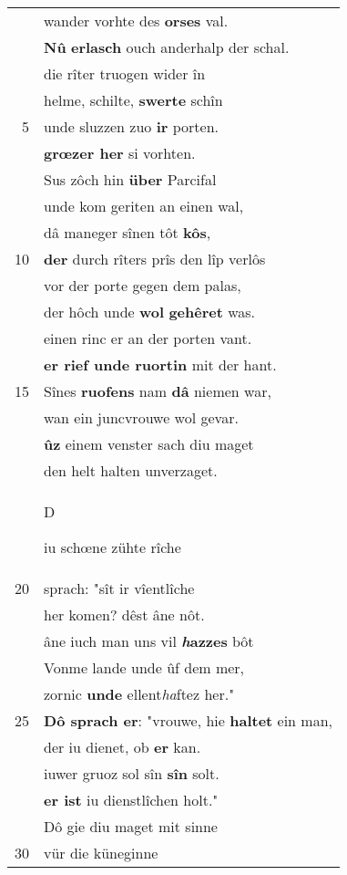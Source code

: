 \documentclass[8pt,a4paper,notitlepage]{article}
\begin{document}
\begin{table}[ht]
\begin{minipage}[t]{0.5\linewidth}
\begin{tabular}{rl}
 & wander vorhte des \textbf{orses} val.\\ 
 & \textbf{Nû} \textbf{erlasch} ouch anderhalp der schal.\\ 
 & die rîter truogen wider în\\ 
 & helme, schilte, \textbf{swerte} schîn\\ 
5 & unde sluzzen zuo \textbf{ir} porten.\\ 
 & \textbf{grœzer her} si vorhten.\\ 
 & Sus zôch hin \textbf{über} Parcifal\\ 
 & unde kom geriten an einen wal,\\ 
 & dâ maneger sînen tôt \textbf{kôs},\\ 
10 & \textbf{der} durch rîters prîs den lîp verlôs\\ 
 & vor der porte gegen dem palas,\\ 
 & der hôch unde \textbf{wol} \textbf{gehêret} was.\\ 
 & einen rinc er an der porten vant.\\ 
 & \textbf{er rief unde ruortin} mit der hant.\\ 
15 & Sînes \textbf{ruofens} nam \textbf{dâ} niemen war,\\ 
 & wan ein juncvrouwe wol gevar.\\ 
 & \textbf{ûz} einem venster sach diu maget\\ 
 & den helt halten unverzaget.\\ 
 & \begin{large}D\end{large}iu schœne zühte rîche\\ 
20 & sprach: "sît ir vîentlîche\\ 
 & her komen? dêst âne nôt.\\ 
 & âne iuch man uns vil \textbf{\textit{h}azzes} bôt\\ 
 & Vonme lande unde ûf dem mer,\\ 
 & zornic \textbf{unde} ellent\textit{ha}ftez her."\\ 
25 & \textbf{Dô sprach er}: "vrouwe, hie \textbf{haltet} ein man,\\ 
 & der iu dienet, ob \textbf{er} kan.\\ 
 & iuwer gruoz sol sîn \textbf{sîn} solt.\\ 
 & \textbf{er ist} iu dienstlîchen holt."\\ 
 & Dô gie diu maget mit sinne\\ 
30 & vür die küneginne\\ 

\end{tabular}
\end{minipage}
\end{table}
\end{document}
